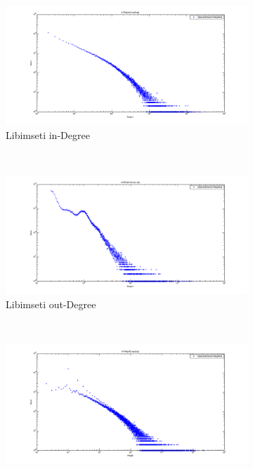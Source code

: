 \begin{figure} 
    \centering 
        \begin{subfigure}[htbp]{0.6\textwidth}
                \includegraphics[width=\textwidth]{FIG/dw_ind.png}
                \caption{Libimseti in-Degree}
                \label{fig:dw_ind}
        \end{subfigure} %
        ~ %
        \begin{subfigure}[htbp]{0.6\textwidth}
                \includegraphics[width=\textwidth]{FIG/dw_outd.png}
                \caption{Libimseti out-Degree}
                \label{fig:dw_outd}
        \end{subfigure}
        ~ %
        \begin{subfigure}[htbp]{0.6\textwidth}
                \includegraphics[width=\textwidth]{FIG/dw_inw.png}

\end{subfigure}
\end{figure}
